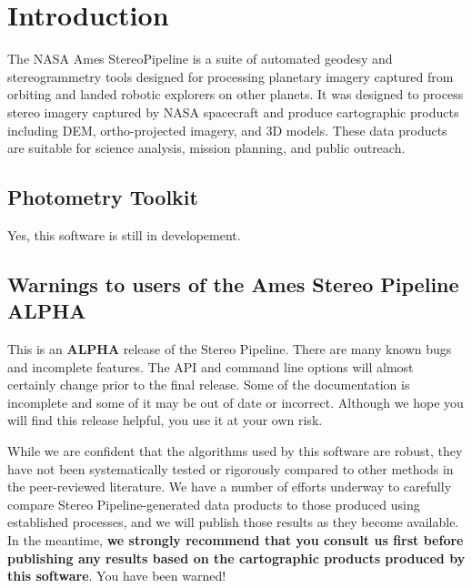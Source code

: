 \chapter{Introduction}

The NASA Ames StereoPipeline is a suite of automated geodesy and
stereogrammetry tools designed for processing planetary imagery
captured from orbiting and landed robotic explorers on other planets.
It was designed to process stereo imagery captured by NASA
spacecraft and produce cartographic products including DEM,
ortho-projected imagery, and 3D models.  These data products are
suitable for science analysis, mission planning, and public outreach.

\section{Photometry Toolkit}
Yes, this software is still in developement.

\section{Warnings to users of the Ames Stereo Pipeline ALPHA}

This is an {\bf ALPHA} release of the Stereo Pipeline.  There are many
known bugs and incomplete features. The API and command line options
will almost certainly change prior to the final release.  Some of the
documentation is incomplete and some of it may be out of date or
incorrect.  Although we hope you will find this release helpful, you
use it at your own risk.

While we are confident that the algorithms used by this software are
robust, they have not been systematically tested or rigorously
compared to other methods in the peer-reviewed literature. We have a
number of efforts underway to carefully compare Stereo
Pipeline-generated data products to those produced using established
processes, and we will publish those results as they become available.
In the meantime, {\bf we strongly recommend that you consult us first
  before publishing any results based on the cartographic products
  produced by this software}. You have been warned!

